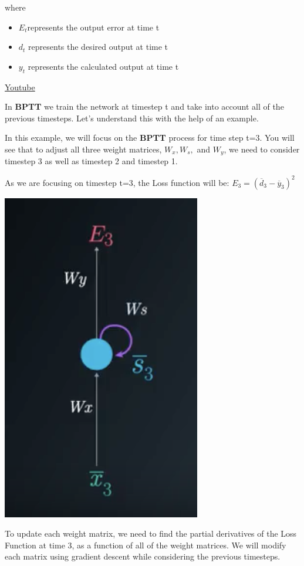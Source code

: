 where
\begin{itemize}
     \item \(E_t\)represents the output error at time t
     \item \(d_t\) represents the desired output at time t
     \item \(y_t\) represents the calculated output at time t
\end{itemize}
\href{https://www.youtube.com/watch?v=eE2L3-2wKac&ab_channel=Udacity}{Youtube} \newline

In \textbf{BPTT} we train the network at timestep t and take into account all of the previous timesteps. Let's understand this with the help of an example. \newline

In this example, we will focus on the \textbf{BPTT} process for time step t=3. You will see that to adjust all three weight matrices, \(W_x, W_s,\) and \(W_y\), we need to consider timestep 3 as well as timestep 2 and timestep 1. \newline

As we are focusing on timestep t=3, the Loss function will be:  \(E_3 = (\overline{d}_3 - \overline{y}_3)^2\)

\includegraphics[width=0.5\linewidth]{img//rnn//intro/screen-shot-2017-11-27-at-1.43.36-pm.png}

To update each weight matrix, we need to find the partial derivatives of the Loss Function at time 3, as a function of all of the weight matrices. We will modify each matrix using gradient descent while considering the previous timesteps.

